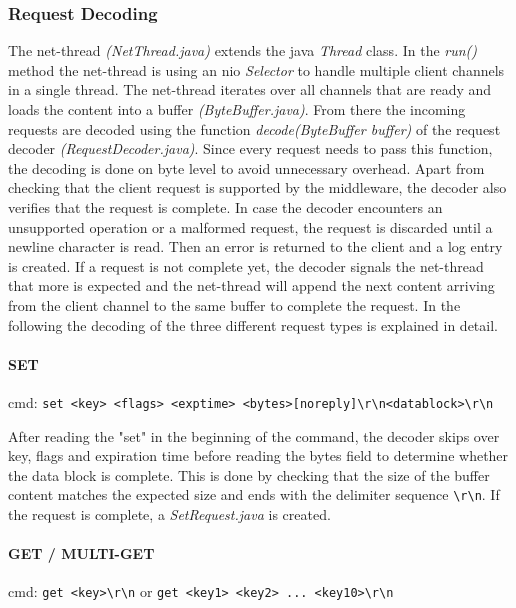 \documentclass[report.tex]{subfiles}
\begin{document}
\subsubsection{Request Decoding}\label{request-decoding}
The net-thread \emph{(NetThread.java)} extends the java \emph{Thread} class. In the \emph{run()} method the net-thread is using an nio \emph{Selector} to handle multiple client channels in a single thread. The net-thread iterates over all channels that are ready and loads the content into a buffer \emph{(ByteBuffer.java)}. From there the incoming requests are decoded using the function \emph{decode(ByteBuffer buffer)} of the request decoder \emph{(RequestDecoder.java)}. Since every request needs to pass this function, the decoding is done on byte level to avoid unnecessary overhead.
Apart from checking that the client request is supported by the middleware, the decoder also verifies that the request is complete. In case the decoder encounters an unsupported operation or a malformed request, the request is discarded until a newline character is read. 
Then an error is returned to the client and a log entry is created. If a request is not complete yet, the decoder signals the net-thread that more is expected and the net-thread will append the next content arriving from the client channel to the same buffer to complete the request.
In the following the decoding of the three different request types is explained in detail. 

\paragraph{SET} cmd: \texttt{set <key> <flags> <exptime> <bytes>[noreply]\textbackslash r\textbackslash n<datablock>\textbackslash r\textbackslash n} 

After reading the "set" in the beginning of the command, the decoder skips over key, flags and expiration time before reading the bytes field to determine whether the data block is complete. This is done by checking that the size of the buffer content matches the expected size and ends with the delimiter sequence \texttt{\textbackslash r\textbackslash n}.
If the request is complete, a \emph{SetRequest.java} is created.

\paragraph{GET / MULTI-GET} cmd: \texttt{get <key>\textbackslash r\textbackslash n} or \texttt{get <key1> <key2> ... <key10>\textbackslash r\textbackslash n}
\end{document}
